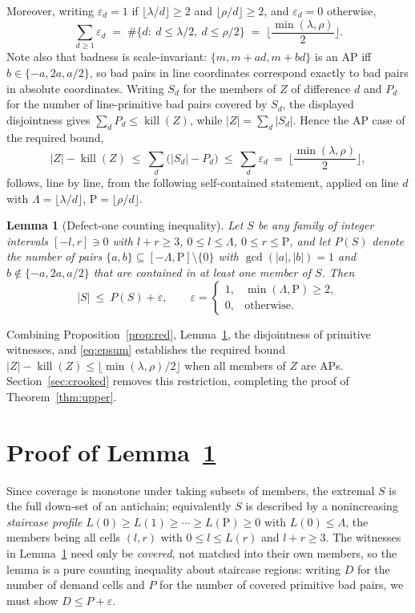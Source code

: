 \documentclass[11pt]{article}
\newtheorem{lemma}[theorem]{Lemma}
\theoremstyle{definition}
\newcommand{\killop}{\operatorname{kill}}
\begin{document}
Moreover, writing $\varepsilon_d=1$ if $\lfloor\lambda/d\rfloor\ge 2$ and $\lfloor\rho/d\rfloor\ge 2$, and $\varepsilon_d=0$ otherwise,
\begin{equation}\label{eq:epsum}
 \sum_{d\ge 1}\varepsilon_d \;=\; \#\{d:\ d\le \lambda/2,\ d\le\rho/2\}\;=\;\Big\lfloor\frac{\min(\lambda,\rho)}{2}\Big\rfloor .
\end{equation}
Note also that badness is scale-invariant: $\{m,m+ad,m+bd\}$ is an AP iff $b\in\{-a,2a,a/2\}$, so bad pairs in line coordinates correspond exactly to bad pairs in absolute coordinates. Writing $S_d$ for the members of $Z$ of difference $d$ and $P_d$ for the number of line-primitive bad pairs covered by $S_d$, the displayed disjointness gives $\sum_d P_d\le\killop(Z)$, while $|Z|=\sum_d|S_d|$. Hence the AP case of the required bound,
\[ |Z|-\killop(Z)\ \le\ \sum_d\bigl(|S_d|-P_d\bigr)\ \le\ \sum_d\varepsilon_d\ =\ \Big\lfloor\frac{\min(\lambda,\rho)}{2}\Big\rfloor, \]
follows, line by line, from the following self-contained statement, applied on line $d$ with $\Lambda=\lfloor\lambda/d\rfloor$, $\mathrm{P}=\lfloor\rho/d\rfloor$.

\begin{lemma}[Defect-one counting inequality]\label{lem:B}
Let $S$ be any family of integer intervals $[-l,r]\ni 0$ with $l+r\ge 3$, $0\le l\le\Lambda$, $0\le r\le\mathrm{P}$, and let $P(S)$ denote the number of pairs $\{a,b\}\subseteq[-\Lambda,\mathrm{P}]\setminus\{0\}$ with $\gcd(|a|,|b|)=1$ and $b\notin\{-a,2a,a/2\}$ that are contained in at least one member of $S$. Then
\[ |S|\ \le\ P(S)+\varepsilon,\qquad \varepsilon=\begin{cases}1,&\min(\Lambda,\mathrm{P})\ge 2,\\ 0,&\text{otherwise.}\end{cases} \]
\end{lemma}

Combining Proposition~\ref{prop:red}, Lemma~\ref{lem:B}, the disjointness of primitive witnesses, and \eqref{eq:epsum} establishes the required bound $|Z|-\killop(Z)\le\lfloor\min(\lambda,\rho)/2\rfloor$ when all members of $Z$ are APs. Section~\ref{sec:crooked} removes this restriction, completing the proof of Theorem~\ref{thm:upper}.

\section{Proof of Lemma~\ref{lem:B}}\label{sec:lemB}

Since coverage is monotone under taking subsets of members, the extremal $S$ is the full down-set of an antichain; equivalently $S$ is described by a nonincreasing \emph{staircase profile} $L(0)\ge L(1)\ge\cdots\ge L(\mathrm{P})\ge 0$ with $L(0)\le\Lambda$, the members being all cells $(l,r)$ with $0\le l\le L(r)$ and $l+r\ge 3$. The witnesses in Lemma~\ref{lem:B} need only be \emph{covered}, not matched into their own members, so the lemma is a pure counting inequality about staircase regions: writing $D$ for the number of demand cells and $P$ for the number of covered primitive bad pairs, we must show $D\le P+\varepsilon$.
\end{document}
